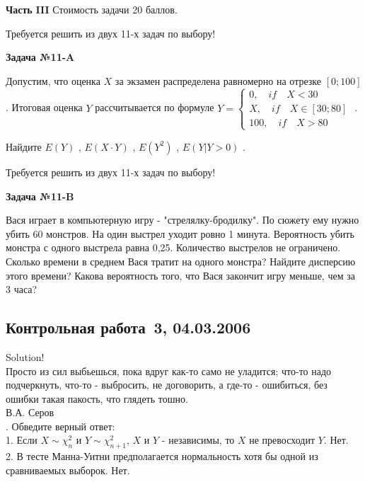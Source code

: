\documentclass[pdftex,12pt,a4paper]{article}
\begin{document}
{\bf Часть }{\bf III} Стоимость задачи 20 баллов.

Требуется решить {\bf {}} из двух 11-х задач по выбору!

{\bf Задача №1}{\bf 1-}{\bf A}

Допустим, что оценка  $X$  за экзамен распределена равномерно на отрезке  $\left[0;100\right]$ . Итоговая оценка  $Y$  рассчитывается по формуле  $Y=\left\{\begin{array}{l} {0,\quad if\quad X<30} \\ {X,\quad if\quad X\in \left[30;80\right]} \\ {100,\quad if\quad X>80} \end{array}\right. $ .

Найдите  $E\left(Y\right)$ ,  $E\left(X\cdot Y\right)$ ,  $E\left(Y^{2} \right)$ ,  $E\left(Y|Y>0\right)$ .

Требуется решить {\bf {}} из двух 11-х задач по выбору!

{\bf Задача №}{\bf 11}{\bf -}{\bf B}

Вася играет в компьютерную игру - "стрелялку-бродилку". По сюжету ему нужно убить 60 монстров. На один выстрел уходит ровно 1 минута. Вероятность убить монстра с одного выстрела равна 0,25. Количество выстрелов не ограничено. Сколько времени в среднем Вася тратит на одного монстра? Найдите дисперсию этого времени? Какова вероятность того, что Вася закончит игру меньше, чем за 3 часа?

\subsection{Контрольная работа \No\,3, 04.03.2006}


Solution! \\

Просто из сил выбьешься, пока вдруг как-то само не уладится;
что-то надо подчеркнуть, что-то - выбросить, не договорить, а
где-то - ошибиться, без ошибки такая пакость, что глядеть тошно. \\
В.А. Серов \\




. Обведите верный ответ: \\

1. Если $X\sim \chi_{n}^{2}$ и $Y\sim \chi_{n+1}^{2}$, $X$ и $Y$ -
независимы, то  $X$ не превосходит $Y$. Нет.  \\

2. В тесте Манна-Уитни предполагается нормальность хотя бы одной
из сравниваемых выборок. Нет. \\
\end{document}

